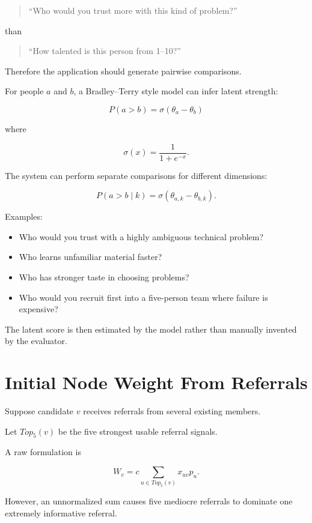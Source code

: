 \documentclass[11pt]{article}
\begin{document}
\begin{quote}
``Who would you trust more with this kind of problem?''
\end{quote}

than

\begin{quote}
``How talented is this person from 1--10?''
\end{quote}

Therefore the application should generate pairwise comparisons.

For people \(a\) and \(b\), a Bradley--Terry style model can infer latent
strength:

\[
P(a > b)
=
\sigma(\theta_a - \theta_b)
\]

where

\[
\sigma(x)=\frac{1}{1+e^{-x}}.
\]

The system can perform separate comparisons for different dimensions:

\[
P(a>b \mid k)
=
\sigma(\theta_{a,k}-\theta_{b,k}).
\]

Examples:

\begin{itemize}
    \item Who would you trust with a highly ambiguous technical problem?
    \item Who learns unfamiliar material faster?
    \item Who has stronger taste in choosing problems?
    \item Who would you recruit first into a five-person team where failure is expensive?
\end{itemize}

The latent score is then estimated by the model rather than manually invented
by the evaluator.

\section{Initial Node Weight From Referrals}

Suppose candidate \(v\) receives referrals from several existing members.

Let \(Top_5(v)\) be the five strongest usable referral signals.

A raw formulation is

\[
W_v
=
c
\sum_{u \in Top_5(v)}
x_{uv} p_u.
\]

However, an unnormalized sum causes five mediocre referrals to dominate one
extremely informative referral.
\end{document}

